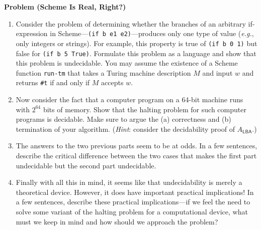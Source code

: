 \documentclass[12pt]{article}
\newcommand{\eg}{\emph{e.g.}\xspace}
\newcommand{\hint}[1]{(\emph{Hint}: #1)}
\newcounter{ProblemCounter}
\newenvironment{problem}[1][]
  {\refstepcounter{ProblemCounter}\noindent\textbf{Problem \theProblemCounter{} (#1)}\quad}
  {\newpage}
\newcommand{\answerbelow}{\noindent\makebox[\linewidth]{\rule{\textwidth}{0.4pt}}}
\begin{document}
\begin{problem}[Scheme Is Real, Right?]

\begin{enumerate}[itemsep=0pt, label=(\alph*)]
  \item Consider the problem of determining whether the branches of an
    arbitrary if-expression in Scheme---\texttt{(if b e1 e2)}---produces only
    one type of value (\eg, only integers or strings).  For example, this
    property is true of \texttt{(if b 0 1)} but false for \texttt{(if b 5
    True)}.  Formulate this problem as a language and show that this problem is
    undecidable.  You may assume the existence of a Scheme function
    \texttt{run-tm} that takes a Turing machine description \( M \) and input
    \( w \) and returns \texttt{\#t} if and only if \( M \) accepts \( w \).
  \item Now consider the fact that a computer program on a 64-bit machine runs
    with \( 2^{64} \) bits of memory.  Show that the halting problem for such
    computer programs is decidable.  Make sure to argue the (a) correctness and
    (b) termination of your algorithm.  \hint{consider the decidability proof
    of \( A_{\mathsf{LBA}} \).}
  \item The answers to the two previous parts seem to be at odds.  In a few
    sentences, describe the critical difference between the two cases that
    makes the first part undecidable but the second part undecidable.
  \item Finally with all this in mind, it seems like that undecidability is
    merely a theoretical device.  However, it does have important practical
    implications!  In a few sentences, describe these practical
    implications---if we feel the need to solve some variant of the halting
    problem for a computational device, what must we keep in mind and how
    should we approach the problem?
\end{enumerate}

\answerbelow


\end{problem}

\end{document}
